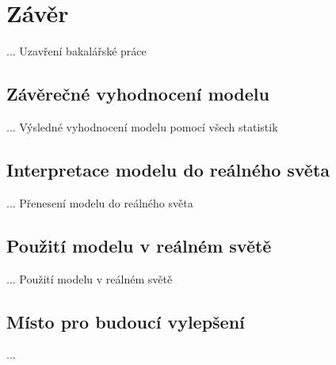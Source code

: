 \chapter{Závěr}
... Uzavření bakalářské práce

\section{Závěrečné vyhodnocení modelu}
... Výsledné vyhodnocení modelu pomocí všech statistik

\section{Interpretace modelu do reálného světa}
... Přenesení modelu do reálného světa

\section{Použití modelu v reálném světě}
... Použití modelu v reálném světě

\section{Místo pro budoucí vylepšení}
...
